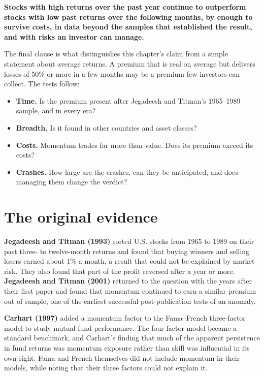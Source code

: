 \begin{callout}
\textbf{Stocks with high returns over the past year continue to outperform stocks with low past returns over the following months, by enough to survive costs, in data beyond the samples that established the result, and with risks an investor can manage.}
\end{callout}

The final clause is what distinguishes this chapter's claim from a simple statement about average returns. A premium that is real on average but delivers losses of 50\% or more in a few months may be a premium few investors can collect. The tests follow:

\begin{itemize}
  \item \textbf{Time.} Is the premium present after Jegadeesh and Titman's 1965--1989 sample, and in every era?
  \item \textbf{Breadth.} Is it found in other countries and asset classes?
  \item \textbf{Costs.} Momentum trades far more than value. Does its premium exceed its costs?
  \item \textbf{Crashes.} How large are the crashes, can they be anticipated, and does managing them change the verdict?
\end{itemize}

\section{The original evidence}
\label{sec:09-evidence}

\textbf{Jegadeesh and Titman (1993)} sorted U.S. stocks from 1965 to 1989 on their past three- to twelve-month returns and found that buying winners and selling losers earned about 1\% a month, a result that could not be explained by market risk. They also found that part of the profit reversed after a year or more. \textbf{Jegadeesh and Titman (2001)} returned to the question with the years after their first paper and found that momentum continued to earn a similar premium out of sample, one of the earliest successful post-publication tests of an anomaly.

\textbf{Carhart (1997)} added a momentum factor to the Fama--French three-factor model to study mutual fund performance. The four-factor model became a standard benchmark, and Carhart's finding that much of the apparent persistence in fund returns was momentum exposure rather than skill was influential in its own right. Fama and French themselves did not include momentum in their models, while noting that their three factors could not explain it.

